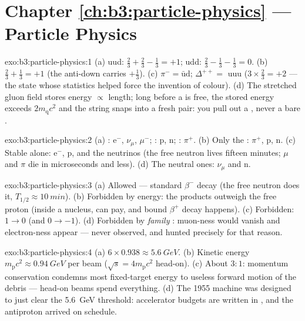 \section*{Chapter \ref{ch:b3:particle-physics} --- Particle Physics}

\begin{solution}{exo:b3:particle-physics:1}
(a) uud: $\tfrac23 + \tfrac23 - \tfrac13 = +1$; udd: $\tfrac23 -
\tfrac13 - \tfrac13 = 0$. (b) $\tfrac23 + \tfrac13 = +1$ (the
anti-down carries $+\tfrac13$). (c) $\pi^- =
\bar{\text{u}}\text{d}$; $\Delta^{++} = $ uuu ($3\times\tfrac23 =
+2$ --- the state whose statistics helped force the invention of
colour). (d) The stretched gluon field stores energy
$\propto$ length; long before a  is free, the stored energy
exceeds $2m_{\text{q}}c^2$ and the string snaps into a fresh
pair: you pull out a , never a bare .
\end{solution}

\begin{solution}{exo:b3:particle-physics:2}
(a) : e$^-$, $\nu_\mu$, $\mu^-$; : p, n; :
$\pi^+$. (b) Only the : $\pi^+$, p, n. (c) Stable alone:
e$^-$, p, and the neutrinos (the free neutron lives fifteen
minutes; $\mu$ and $\pi$ die in microseconds and less). (d) The
neutral ones: $\nu_\mu$ and n.
\end{solution}

\begin{solution}{exo:b3:particle-physics:3}
(a) Allowed --- standard $\beta^-$ decay (the free neutron does
it, $T_{1/2} \approx \qty{10}{min}$). (b) Forbidden by energy:
the products outweigh the free proton (inside a nucleus,  can pay, and bound $\beta^+$ decay happens). (c)
Forbidden:  $1 \to 0$ (and 
$0 \to -1$). (d) Forbidden by \emph{family} :
muon-ness would vanish and electron-ness appear --- never
observed, and hunted precisely for that reason.
\end{solution}

\begin{solution}{exo:b3:particle-physics:4}
(a) $6\times0.938 \approx \qty{5.6}{GeV}$. (b) Kinetic energy
$m_{\text{p}}c^2 \approx \qty{0.94}{GeV}$ per beam
($\sqrt s = 4m_{\text{p}}c^2$ head-on). (c) About $3:1$:
momentum conservation condemns most fixed-target energy to
useless forward motion of the debris --- head-on beams spend
everything. (d) The 1955 machine was designed to just clear the
\qty{5.6}{GeV} threshold: accelerator budgets are written in
, and the antiproton arrived on schedule.
\end{solution}

